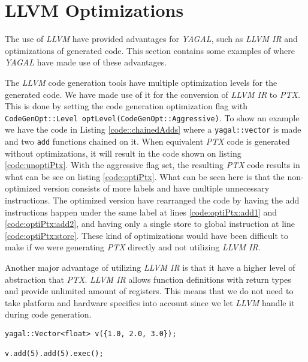 \section{LLVM Optimizations}

The use of \textit{LLVM} have provided advantages for \textit{YAGAL}, such as \textit{LLVM IR} and optimizations of generated code. This section contains some examples of where \textit{YAGAL} have made use of these advantages.

The \textit{LLVM} code generation tools have multiple optimization levels for the generated code. We have made use of it for the conversion of \textit{LLVM IR} to \textit{PTX}. This is done by setting the code generation optimization flag with \texttt{CodeGenOpt::Level optLevel(CodeGenOpt::Aggressive)}. To show an example we have the code in Listing \ref{code::chainedAdds} where a \texttt{yagal::vector} is made and two \texttt{add} functions chained on it. When equivalent \textit{PTX} code is generated without optimizations, it will result in the code shown on listing \ref{code:unoptiPtx}. With the aggressive flag set, the resulting \textit{PTX} code results in what can be see on listing \ref{code:optiPtx}. 
What can be seen here is that the non-optimized version consists of more labels and have multiple unnecessary instructions. The optimized version have rearranged the code by having the add instructions happen under the same label at lines \ref{code:optiPtx:add1} and \ref{code:optiPtx:add2}, and having only a single store to global instruction at line \ref{code:optiPtx:store}. These kind of optimizations would have been difficult to make if we were generating \textit{PTX} directly and not utilizing \textit{LLVM IR}.

Another major advantage of utilizing \textit{LLVM IR} is that it have a higher level of abstraction that \textit{PTX}. \textit{LLVM IR} allows function definitions with return types and provide unlimited amount of registers. This means that we do not need to take platform and hardware specifics into account since we let \textit{LLVM} handle it during code generation.

\begin{lstlisting}[caption={Chained \texttt{yagal::Vector::add}.}, label={code::chainedAdds}]
yagal::Vector<float> v({1.0, 2.0, 3.0});

v.add(5).add(5).exec();
\end{lstlisting}

